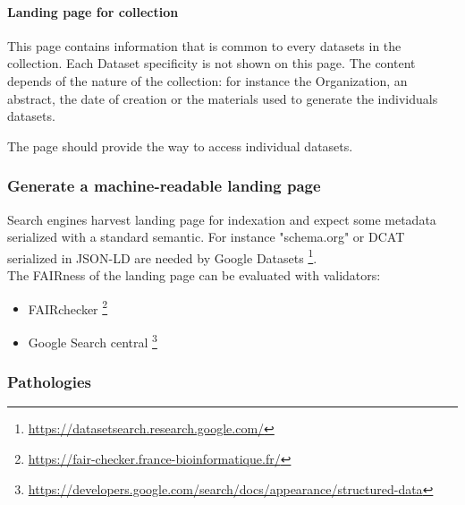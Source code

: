 \documentclass[11pt,a4paper]{ivoa}
\begin{document}
\paragraph{Landing page for collection}
This page contains information that is common to every datasets in the collection. Each Dataset specificity is not shown on this page. The content depends of the nature of the collection: for instance the Organization, an abstract, the date of creation or the materials used to generate the individuals datasets.

The page should provide the way to access individual datasets.

\subsubsection{Generate a machine-readable landing page}
Search engines harvest landing page for indexation and expect some metadata serialized with a standard semantic. For instance "schema.org" or DCAT serialized in JSON-LD are needed by Google Datasets \footnote{\url{https://datasetsearch.research.google.com/}}.\\


The FAIRness of the landing page can be evaluated with validators:
\begin{itemize}
    \item FAIRchecker \footnote{\url{https://fair-checker.france-bioinformatique.fr/}}
    \item Google Search central \footnote{\url{https://developers.google.com/search/docs/appearance/structured-data}}
\end{itemize}


\subsubsection{Pathologies}
\end{document}
